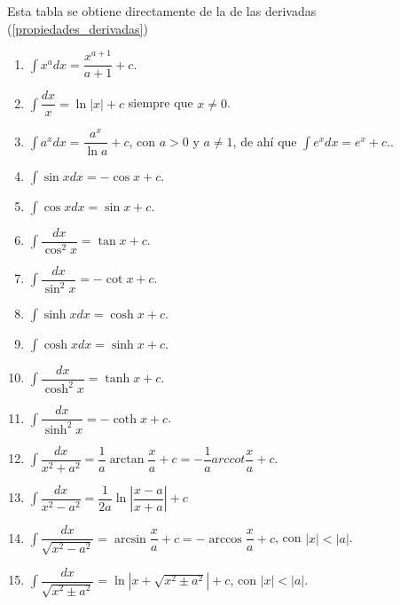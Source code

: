 \documentclass[10pt,twoside]{SelfArx} %
\begin{document}
Esta tabla se obtiene directamente de la de las derivadas (\ref{propiedades_derivadas})   
\begin{enumerate}\label{tabla_integrales}
	\item $ \displaystyle\int x^{a}dx=\dfrac{x^{a+1}}{a+1}+c $.
	\item $ \displaystyle\int \dfrac{dx}{x}=\ln |x|+c $ siempre que $ x\neq0 $.
	\item $ \displaystyle\int a^{x}dx=\dfrac{a^{x}}{\ln a}+c $, con $ a>0 $ y $ a\neq1 $, de ah\'i que $ \int e^{x}dx=e^{x}+c. $.
	\item $ \displaystyle\int \sin xdx=-\cos x+ c $.
	\item $ \displaystyle\int \cos xdx=\sin x+c $.
	\item $ \displaystyle\int\dfrac{dx}{\cos^{2}x}=\tan x+c $.
	\item $ \displaystyle\int \dfrac{dx}{\sin^{2}x}=-\cot x+c $.
	\item $ \displaystyle\int \sinh xdx=\cosh x+c $.
	\item $ \displaystyle\int \cosh xdx=\sinh x+c $.
	\item $ \displaystyle\int\dfrac{dx}{\cosh^{2} x}=\tanh x+c $.
	\item $ \displaystyle\int\dfrac{dx}{\sinh^{2} x}=-\coth x+c $.
	\item $ \displaystyle\int \dfrac{dx}{x^{2}+a^{2}}=\dfrac{1}{a}\arctan\dfrac{x}{a}+c=-\dfrac{1}{a}arccot\dfrac{x}{a}+c $.
	\item $ \displaystyle\int \dfrac{dx}{x^{2}-a^{2}}=\dfrac{1}{2a}\ln\left |\dfrac{x-a}{x+a}\right |+c $
	\item $ \displaystyle\int \dfrac{dx}{\sqrt{x^{2}-a^{2}}}=\arcsin \dfrac{x}{a}+c=-\arccos\dfrac{x}{a}+c$, con $ |x|<|a| $.
	\item $ \displaystyle\int \dfrac{dx}{\sqrt{x^{2}\pm a^{2}}}=\ln |x+\sqrt{x^{2}\pm a^{2}}|+c $, con $ |x|<|a| $.
	
	
	
	
	
\end{enumerate}
   
   
   
   
   
   
   
\end{document}
